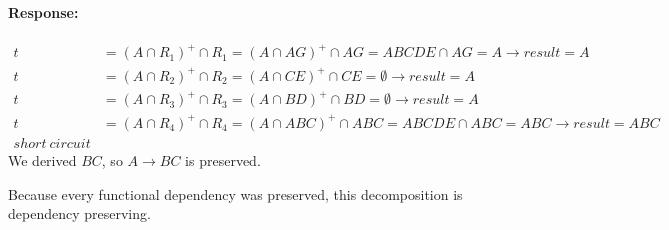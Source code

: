\documentclass{report}
\newenvironment{response}{\begin{responseframe}\vspace{-10pt}\paragraph{Response:}}{\end{responseframe}}
\begin{document}
\begin{response}
\begin{itemize}[itemsep=0em]
\begin{align*}
                t &= (A \cap R_1)^+ \cap R_1
                = (A \cap AG)^+ \cap AG
                = ABCDE \cap AG = A \to result = A \\
                t &= (A \cap R_2)^+ \cap R_2
                = (A \cap CE)^+ \cap CE
                = \emptyset \to result = A \\
                t &= (A \cap R_3)^+ \cap R_3
                = (A \cap BD)^+ \cap BD
                = \emptyset \to result = A \\
                t &= (A \cap R_4)^+ \cap R_4
                = (A \cap ABC)^+ \cap ABC
                = ABCDE \cap ABC = ABC \to result = ABC \\
                short \ circuit
            \end{align*}
            We derived $BC$, so $A \to BC$ is preserved.
    \end{itemize}
    Because every functional dependency was preserved, this decomposition is dependency preserving.
\end{response}
\end{document}

